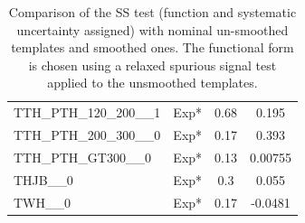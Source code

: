 \begin{table}[!h]
{\begin{tabular}{llcc}
			TTH\_PTH\_120\_200\_\_1                                     & Exp* &0.68&0.195\\
			TTH\_PTH\_200\_300\_\_0                                     & Exp* &0.17&0.393\\
			TTH\_PTH\_GT300\_\_0                                        & Exp* &0.13&0.00755\\
			THJB\_\_0                                                   & Exp* &0.3&0.055\\
			TWH\_\_0                                                    & Exp* &0.17&-0.0481\\
			\hline\hline		
		\end{tabular}
	}
	\caption{
		Comparison of the SS test (function and systematic uncertainty assigned) with nominal un-smoothed templates and smoothed ones. The functional form is chosen using a relaxed spurious signal test applied to the unsmoothed templates.
		\label{tab:comp_smooth_unsmooth2}   }   
\end{table}


